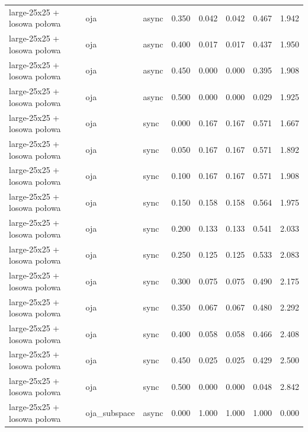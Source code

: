 \begin{tabular}{lllrrrrr}
large-25x25 + losowa połowa & oja & async & 0.350 & 0.042 & 0.042 & 0.467 & 1.942 \\

large-25x25 + losowa połowa & oja & async & 0.400 & 0.017 & 0.017 & 0.437 & 1.950 \\

large-25x25 + losowa połowa & oja & async & 0.450 & 0.000 & 0.000 & 0.395 & 1.908 \\

large-25x25 + losowa połowa & oja & async & 0.500 & 0.000 & 0.000 & 0.029 & 1.925 \\

large-25x25 + losowa połowa & oja & sync & 0.000 & 0.167 & 0.167 & 0.571 & 1.667 \\

large-25x25 + losowa połowa & oja & sync & 0.050 & 0.167 & 0.167 & 0.571 & 1.892 \\

large-25x25 + losowa połowa & oja & sync & 0.100 & 0.167 & 0.167 & 0.571 & 1.908 \\

large-25x25 + losowa połowa & oja & sync & 0.150 & 0.158 & 0.158 & 0.564 & 1.975 \\

large-25x25 + losowa połowa & oja & sync & 0.200 & 0.133 & 0.133 & 0.541 & 2.033 \\

large-25x25 + losowa połowa & oja & sync & 0.250 & 0.125 & 0.125 & 0.533 & 2.083 \\

large-25x25 + losowa połowa & oja & sync & 0.300 & 0.075 & 0.075 & 0.490 & 2.175 \\

large-25x25 + losowa połowa & oja & sync & 0.350 & 0.067 & 0.067 & 0.480 & 2.292 \\

large-25x25 + losowa połowa & oja & sync & 0.400 & 0.058 & 0.058 & 0.466 & 2.408 \\

large-25x25 + losowa połowa & oja & sync & 0.450 & 0.025 & 0.025 & 0.429 & 2.500 \\

large-25x25 + losowa połowa & oja & sync & 0.500 & 0.000 & 0.000 & 0.048 & 2.842 \\

large-25x25 + losowa połowa & oja\_subspace & async & 0.000 & 1.000 & 1.000 & 1.000 & 0.000 \\


\end{tabular}
